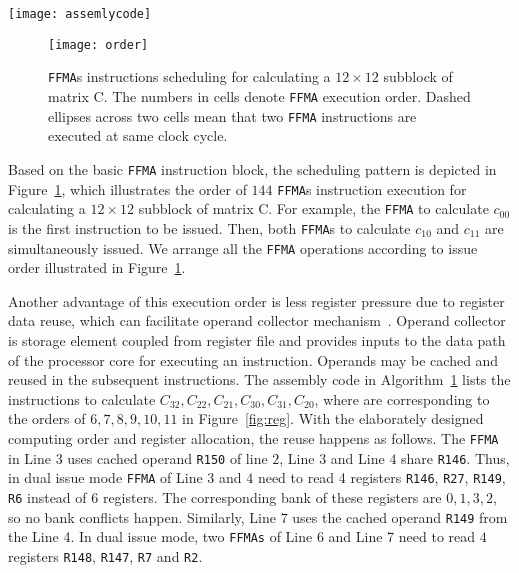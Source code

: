 \begin{figure*}[htbp]
\begin{center}
\texttt{[image: assemlycode]}
    \caption{The comparison of compiler generated codes and our tuned assembly codes.}
\label{fig:assemblycode}
\end{center}
\end{figure*}

\begin{figure}[htbp]
\begin{center}
\texttt{[image: order]}
\caption{{\tt FFMA}s instructions scheduling for calculating a $12\times 12$ subblock of matrix C.  The numbers in cells denote {\tt FFMA} execution order. Dashed ellipses across two cells mean that two {\tt FFMA} instructions are executed at same clock cycle.}
\label{fig:order}
\end{center}
\end{figure}

Based on the basic {\tt FFMA} instruction block, the scheduling pattern is depicted in Figure~\ref{fig:order}, which
illustrates the order of $144$ {\tt FFMA}s instruction execution for calculating a $12\times 12$ subblock of matrix C.
For example, the {\tt FFMA} to calculate $c_{00}$ is the first instruction to be issued. Then, both {\tt FFMA}s to
calculate $c_{10}$ and  $c_{11}$ are simultaneously issued. We arrange all the {\tt FFMA} operations according to issue
order illustrated in Figure~\ref{fig:order}.

Another advantage of this execution order is less register pressure due to register data reuse, which can facilitate
operand collector mechanism~\cite{collector}. Operand collector is storage element coupled from register file and
provides inputs to the data path of the processor core for executing an instruction. Operands may be cached and reused
in the subsequent instructions. The assembly code in Algorithm~\ref{fig:order} lists the instructions to calculate
$C_{32},C_{22}, C_{21}, C_{30}, C_{31}, C_{20}$, where are corresponding to the orders of $6,7,8,9,10,11$ in
Figure~\ref{fig:reg}. With the elaborately designed computing order and register allocation, the reuse happens as follows. The {\tt FFMA} in Line $3$ uses cached operand {\tt R150} of line $2$, Line $3$ and Line $4$ share {\tt R146}. Thus, in dual issue mode {\tt FFMA} of Line $3$ and $4$ need to read 4 registers {\tt R146}, {\tt R27}, {\tt R149}, {\tt R6} instead of $6$ registers. The corresponding bank of these registers are $0,1,3,2$, so no bank conflicts happen.
Similarly, Line 7 uses the cached operand {\tt R149} from the Line 4. In dual issue mode, two {\tt FFMAs} of Line 6 and Line 7 need to read $4$ registers {\tt R148}, {\tt R147}, {\tt R7} and {\tt R2}.


